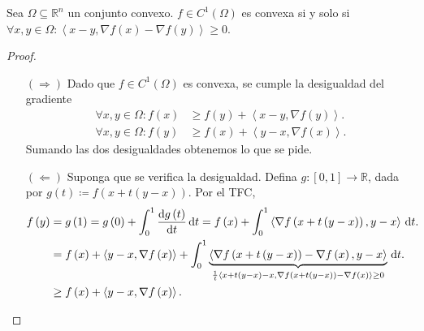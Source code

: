 \begin{theorem}
Sea $\Omega\subseteq\mathbb{R}^{n}$ un conjunto convexo. $f\in C^{1}\left(\Omega\right)$ es convexa si y solo si
$\forall x,y\in\Omega:\left\langle x-y,\nabla f\left(x\right)-\nabla f\left(y\right)\right\rangle\geq 0$.
\end{theorem}

\begin{proof}
\begin{itemize}
\item[$\left(\Longrightarrow\right)$]
Dado que $f\in C^{1}\left(\Omega\right)$ es convexa, se cumple la desigualdad del gradiente
\begin{align*}
\forall x,y\in\Omega:f\left(x\right) & \geq f\left(y\right)+\left\langle x-y,\nabla f\left(y\right)\right\rangle. \\
\forall x,y\in\Omega:f\left(y\right) & \geq f\left(x\right)+\left\langle y-x,\nabla f\left(x\right)\right\rangle.
\end{align*}
Sumando las dos desigualdades obtenemos lo que se pide.
\item[$\left(\Longleftarrow\right)$]
Suponga que se verifica la desigualdad. Defina $g\colon\left[0,1\right]\to\mathbb{R}$, dada por
$g\left(t\right)\coloneqq f\left(x+t\left(y-x\right)\right)$.
Por el TFC,
\begin{align*}
f\left(y\right) & = g\left(1\right)=g\left(0\right)+\int_{0}^{1}\diff{g\left(t\right)}{t}\dl t=
f\left(x\right)+\int_{0}^{1}\left\langle\nabla f\left(x+t\left(y-x\right)\right),y-x\right\rangle\dl t. \\
& =f\left(x\right)+\left\langle y-x,\nabla f\left(x\right)\right\rangle+\int_{0}^{1}
\underbrace{\left\langle\nabla f\left(x+t\left(y-x\right)\right)-\nabla f\left(x\right),y-x\right\rangle}_{
\frac{1}{t}\left\langle x+t\left(y-x\right)-x,\nabla f\left(x+t\left(y-x\right)\right)-\nabla f\left(x\right)\right\rangle
\geq 0}\dl t.                                                                                                 \\
& \geq f\left(x\right)+\left\langle y-x,\nabla f\left(x\right)\right\rangle.
\end{align*}
\end{itemize}
\end{proof}
